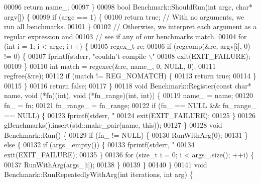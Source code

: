 \begin{DoxyCode}
00096   \textcolor{keywordflow}{return} name\_;
00097 \}
00098 \textcolor{keywordtype}{bool} Benchmark::ShouldRun(\textcolor{keywordtype}{int} argc, \textcolor{keywordtype}{char}* argv[]) \{
00099   \textcolor{keywordflow}{if} (argc == 1) \{
00100     \textcolor{keywordflow}{return} \textcolor{keyword}{true};  \textcolor{comment}{// With no arguments, we run all benchmarks.}
00101   \}
00102   \textcolor{comment}{// Otherwise, we interpret each argument as a regular expression and}
00103   \textcolor{comment}{// see if any of our benchmarks match.}
00104   \textcolor{keywordflow}{for} (\textcolor{keywordtype}{int} i = 1; i < argc; i++) \{
00105     regex\_t re;
00106     \textcolor{keywordflow}{if} (regcomp(&re, argv[i], 0) != 0) \{
00107       fprintf(stderr, \textcolor{stringliteral}{"couldn't compile \(\backslash\)"%
00108       exit(EXIT\_FAILURE);
00109     \}
00110     \textcolor{keywordtype}{int} match = regexec(&re, name\_, 0, NULL, 0);
00111     regfree(&re);
00112     \textcolor{keywordflow}{if} (match != REG\_NOMATCH) \{
00113       \textcolor{keywordflow}{return} \textcolor{keyword}{true};
00114     \}
00115   \}
00116   \textcolor{keywordflow}{return} \textcolor{keyword}{false};
00117 \}
00118 \textcolor{keywordtype}{void} Benchmark::Register(\textcolor{keyword}{const} \textcolor{keywordtype}{char}* name, \textcolor{keywordtype}{void} (*fn)(\textcolor{keywordtype}{int}), \textcolor{keywordtype}{void} (*fn\_range)(\textcolor{keywordtype}{int}, \textcolor{keywordtype}{int})) \{
00119   name\_ = name;
00120   fn\_ = fn;
00121   fn\_range\_ = fn\_range;
00122   \textcolor{keywordflow}{if} (fn\_ == NULL && fn\_range\_ == NULL) \{
00123     fprintf(stderr, \textcolor{stringliteral}{"%
00124     exit(EXIT\_FAILURE);
00125   \}
00126   gBenchmarks().insert(std::make\_pair(name, \textcolor{keyword}{this}));
00127 \}
00128 \textcolor{keywordtype}{void} Benchmark::Run() \{
00129   \textcolor{keywordflow}{if} (fn\_ != NULL) \{
00130     RunWithArg(0);
00131   \} \textcolor{keywordflow}{else} \{
00132     \textcolor{keywordflow}{if} (args\_.empty()) \{
00133       fprintf(stderr, \textcolor{stringliteral}{"%
00134       exit(EXIT\_FAILURE);
00135     \}
00136     \textcolor{keywordflow}{for} (\textcolor{keywordtype}{size\_t} i = 0; i < args\_.size(); ++i) \{
00137       RunWithArg(args\_[i]);
00138     \}
00139   \}
00140 \}
00141 \textcolor{keywordtype}{void} Benchmark::RunRepeatedlyWithArg(\textcolor{keywordtype}{int} iterations, \textcolor{keywordtype}{int} arg) \{
}}}
\end{DoxyCode}
